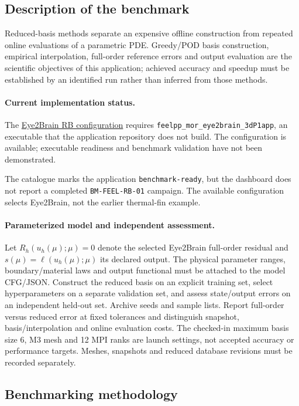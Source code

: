 \subsection{Description of the benchmark}

Reduced-basis methods separate an expensive offline construction from repeated
online evaluations of a parametric PDE. Greedy/POD basis construction, empirical
interpolation, full-order reference errors and output evaluation are the
scientific objectives of this application; achieved accuracy and speedup must
be established by an identified run rather than inferred from those methods.

\paragraph{Current implementation status.}
The \href{https://github.com/numpex/apps-feelpp/blob/main/src/app-feelpp-rb/rb_eye2brain.json}{Eye2Brain RB configuration}
requires \nolinkurl{feelpp_mor_eye2brain_3dP1app}, an executable that the
application repository does not build. The configuration is available;
executable readiness and benchmark validation have not been demonstrated.

The catalogue marks the application \texttt{benchmark-ready}, but the dashboard
does not report a completed \texttt{BM-FEEL-RB-01} campaign. The available
configuration selects Eye2Brain, not the earlier thermal-fin example.


\paragraph{Parameterized model and independent assessment.}
Let $R_h(u_h(\mu);\mu)=0$ denote the selected Eye2Brain full-order residual and
$s(\mu)=\ell(u_h(\mu);\mu)$ its declared output. The physical parameter ranges,
boundary/material laws and output functional must be attached to the model
CFG/JSON. Construct the reduced basis on an explicit training set, select
hyperparameters on a separate validation set, and assess state/output errors
on an independent held-out set. Archive seeds and sample lists. Report
full-order versus reduced error at fixed tolerances and distinguish snapshot,
basis/interpolation and online evaluation costs. The checked-in maximum basis
size 6, M3 mesh and 12 MPI ranks are launch settings, not accepted accuracy
or performance targets. Meshes, snapshots and reduced database revisions
must be recorded separately.

\subsection{Benchmarking methodology}

